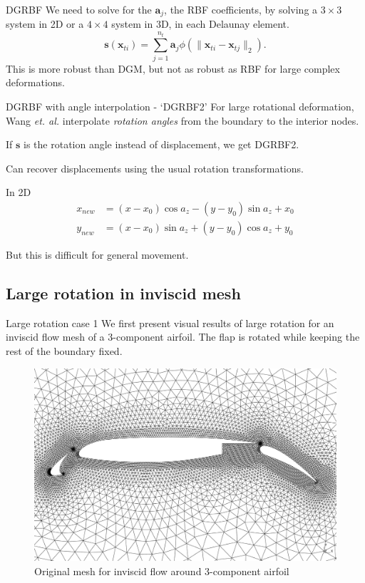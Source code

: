 \documentclass[t,12pt]{beamer}
\let\bld\boldsymbol
\begin{document}
\begin{frame}{DGRBF}
We need to solve for the $\bld{a}_j$, the RBF coefficients, by solving a $3 \times 3$ system in 2D or a $4 \times 4$ system in 3D, in each Delaunay element.
\begin{equation}
\mathbf{s}(\mathbf{x}_{ti}) = \sum_{j=1}^{n_t} \mathbf{a}_j \phi(\lVert\mathbf{x}_{ti} - \mathbf{x}_{tj}\rVert_2).
\label{eqn:dgrbfsys}
\end{equation}
This is more robust than DGM, but not as robust as RBF for large complex deformations.
\end{frame}

\begin{frame}{DGRBF with angle interpolation - `DGRBF2'}
For large rotational deformation, Wang \emph{et. al.} interpolate \emph{rotation angles} from the boundary to the interior nodes.

If $\bld{s}$ is the rotation angle instead of displacement, we get DGRBF2.

Can recover displacements using the usual rotation transformations.
\begin{exampleblock}{In 2D}
 \begin{align}
 x_{new} &= (x-x_0)\cos a_z - (y-y_0)\sin a_z + x_0 \\
 y_{new} &= (x-x_0)\sin a_z + (y-y_0)\cos a_z + y_0
 \end{align}
\end{exampleblock}
But this is difficult for general movement.
\end{frame}

\subsection{Large rotation in inviscid mesh}

\begin{frame}{Large rotation case 1}
We first present visual results of large rotation for an inviscid flow mesh of a 3-component airfoil. The flap is rotated while keeping the rest of the boundary fixed.
\begin{figure}
	\centering
	\includegraphics[scale=0.16]{3comp-inviscid}
	\caption{Original mesh for inviscid flow around 3-component airfoil}
	\label{fig:wing-inviscid}
\end{figure}
\end{frame}
\end{document}
